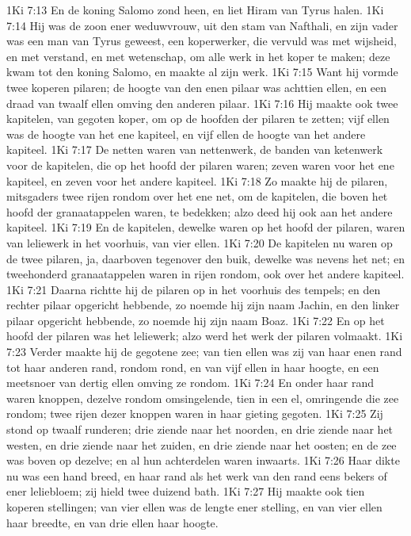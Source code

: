 1Ki 7:13  En de koning Salomo zond heen, en liet Hiram van Tyrus halen.
1Ki 7:14  Hij was de zoon ener weduwvrouw, uit den stam van Nafthali, en zijn vader was een man van Tyrus geweest, een koperwerker, die vervuld was met wijsheid, en met verstand, en met wetenschap, om alle werk in het koper te maken; deze kwam tot den koning Salomo, en maakte al zijn werk.
1Ki 7:15  Want hij vormde twee koperen pilaren; de hoogte van den enen pilaar was achttien ellen, en een draad van twaalf ellen omving den anderen pilaar.
1Ki 7:16  Hij maakte ook twee kapitelen, van gegoten koper, om op de hoofden der pilaren te zetten; vijf ellen was de hoogte van het ene kapiteel, en vijf ellen de hoogte van het andere kapiteel.
1Ki 7:17  De netten waren van nettenwerk, de banden van ketenwerk voor de kapitelen, die op het hoofd der pilaren waren; zeven waren voor het ene kapiteel, en zeven voor het andere kapiteel.
1Ki 7:18  Zo maakte hij de pilaren, mitsgaders twee rijen rondom over het ene net, om de kapitelen, die boven het hoofd der granaatappelen waren, te bedekken; alzo deed hij ook aan het andere kapiteel.
1Ki 7:19  En de kapitelen, dewelke waren op het hoofd der pilaren, waren van leliewerk in het voorhuis, van vier ellen.
1Ki 7:20  De kapitelen nu waren op de twee pilaren, ja, daarboven tegenover den buik, dewelke was nevens het net; en tweehonderd granaatappelen waren in rijen rondom, ook over het andere kapiteel.
1Ki 7:21  Daarna richtte hij de pilaren op in het voorhuis des tempels; en den rechter pilaar opgericht hebbende, zo noemde hij zijn naam Jachin, en den linker pilaar opgericht hebbende, zo noemde hij zijn naam Boaz.
1Ki 7:22  En op het hoofd der pilaren was het leliewerk; alzo werd het werk der pilaren volmaakt.
1Ki 7:23  Verder maakte hij de gegotene zee; van tien ellen was zij van haar enen rand tot haar anderen rand, rondom rond, en van vijf ellen in haar hoogte, en een meetsnoer van dertig ellen omving ze rondom.
1Ki 7:24  En onder haar rand waren knoppen, dezelve rondom omsingelende, tien in een el, omringende die zee rondom; twee rijen dezer knoppen waren in haar gieting gegoten.
1Ki 7:25  Zij stond op twaalf runderen; drie ziende naar het noorden, en drie ziende naar het westen, en drie ziende naar het zuiden, en drie ziende naar het oosten; en de zee was boven op dezelve; en al hun achterdelen waren inwaarts.
1Ki 7:26  Haar dikte nu was een hand breed, en haar rand als het werk van den rand eens bekers of ener leliebloem; zij hield twee duizend bath.
1Ki 7:27  Hij maakte ook tien koperen stellingen; van vier ellen was de lengte ener stelling, en van vier ellen haar breedte, en van drie ellen haar hoogte.
